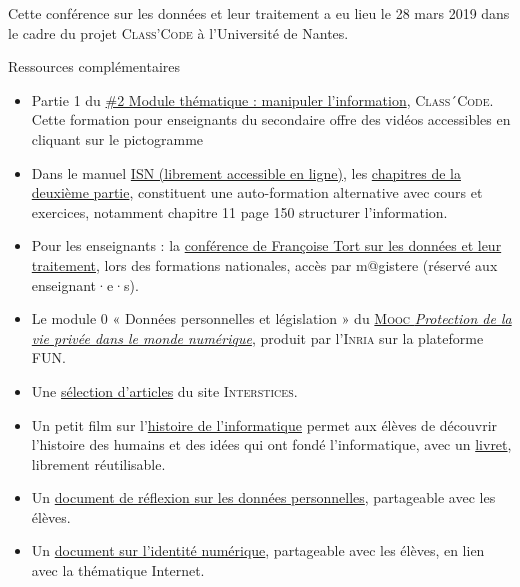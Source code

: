 Cette conférence sur les données et leur traitement a eu lieu le 28 mars 2019 dans le cadre du projet \textsc{Class'Code} à l’Université de Nantes.

\begin{gofurther}{Ressources complémentaires}
\begin{itemize}\jazzitem
	\item Partie 1 du \href{https://pixees.fr/classcode/formations/module2/#partie1}{\#2 Module thématique : manipuler l’information}, \textsc{Class´Code}. Cette formation pour enseignants du secondaire offre des vidéos accessibles en cliquant sur le pictogramme 
\item  Dans le manuel \href{https://wiki.inria.fr/wikis/sciencinfolycee/images/a/a7/Informatique_et_Sciences_du_Num%C3%A9rique_-_Sp%C3%A9cialit%C3%A9_ISN_en_Terminale_S._version_Python.pdf}{ISN (librement accessible en ligne)}, les \href{}{chapitres de la deuxième partie}, constituent une auto-formation alternative avec cours et exercices, notamment chapitre 11 page 150 structurer l'information.
\item Pour les enseignants : la \href{https://magistere.education.fr/dgesco/}{conférence de Françoise Tort sur les données et leur traitement}, lors des formations nationales, accès par m@gistere (réservé aux enseignant·e·s).
\item Le module 0 « Données personnelles et législation » du \href{https://www.fun-mooc.fr/courses/course-v1:inria+41015+session03/about}{\textsc{Mooc} \textit{Protection de la vie privée dans le monde numérique}}, produit par l'\textsc{Inria} sur la plateforme FUN.
\item Une \href{https://interstices.info/dossier/snt-donnees-structurees-et-leur-traitement/}{sélection d'articles} du site \textsc{Interstices}.
\end{itemize}

\begin{itemize}\jazzitem
\item Un petit film sur l'\href{http://sparticipatives.gforge.inria.fr/film/}{histoire de l'informatique} permet aux élèves de découvrir l'histoire des humains et des idées qui ont fondé l'informatique, avec un \href{http://sparticipatives.gforge.inria.fr/film/livret.pdf}{livret}, librement réutilisable.
\item Un \href{https://openclassrooms.com/fr/courses/3930076-manipuler-linformation/3930696-vos-donnees-pour-quoi-faire}{document de réflexion sur les données personnelles}, partageable avec les élèves.
\item Un \href{https://openclassrooms.com/fr/courses/4297411-connecter-le-reseau/4304641-comprenez-l-evolution-des-reseaux\#r-4358298}{document sur l'identité numérique}, partageable avec les élèves, en lien avec la thématique Internet.
\end{itemize}
\end{gofurther}

